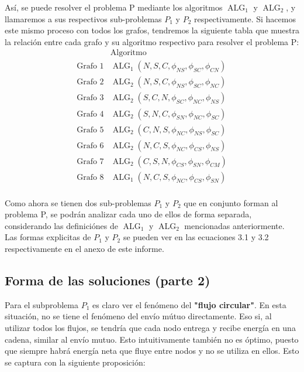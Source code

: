 \documentclass[12pt,twoside]{article}
\begin{document}
	\hspace{1cm} As\'i, se puede resolver el problema P mediante los algoritmos \(\operatorname{ALG}_1\) y \(\operatorname{ALG}_2\), y llamaremos a sus respectivos sub-problemas \(P_1\) y \(P_2\) respectivamente. Si hacemos este mismo proceso con todos los grafos, tendremos la siguiente tabla que muestra la relaci\'on entre cada grafo y su algoritmo respectivo para resolver el problema P:
	\begin{equation*}
		\begin{array}{c|c}
			& \text{Algoritmo} \\ \hline 
			\text{Grafo 1} & \operatorname{ALG}_1(N,S,C,\phi_{NS},\phi_{SC},\phi_{CN}) \\
			\text{Grafo 2} & \operatorname{ALG}_2(N,S,C,\phi_{NS},\phi_{SC},\phi_{NC}) \\
			\text{Grafo 3} & \operatorname{ALG}_2(S,C,N,\phi_{SC},\phi_{NC},\phi_{NS}) \\
			\text{Grafo 4} & \operatorname{ALG}_2(S,N,C,\phi_{SN},\phi_{NC},\phi_{SC}) \\
			\text{Grafo 5} &  \operatorname{ALG}_2(C,N,S,\phi_{NC},\phi_{NS},\phi_{SC})  \\
			\text{Grafo 6} & \operatorname{ALG}_2(N,C,S,\phi_{NC},\phi_{CS},\phi_{NS}) \\
			\text{Grafo 7} & \operatorname{ALG}_2(C,S,N,\phi_{CS},\phi_{SN},\phi_{CM}) \\
			\text{Grafo 8} & \operatorname{ALG}_1(N,C,S,\phi_{NC},\phi_{CS},\phi_{SN}) \\
		\end{array}
	\end{equation*}
	
	\hspace{1cm}Como ahora se tienen dos sub-problemas \(P_1\) y \(P_2\) que en conjunto forman al problema P, se podr\'an analizar cada uno de ellos de forma separada, considerando las definici\'ones de \(\operatorname{ALG}_1\) y \(\operatorname{ALG}_2\) mencionadas anteriormente. Las formas explicitas de \(P_1\) y \(P_2\) se pueden ver en las ecuaciones 3.1 y 3.2 respectivamente en el anexo de este informe.
	
	\subsection{Forma de las soluciones (parte 2)}
	\hspace{1cm} Para el subproblema \(P_1\) es claro ver el fen\'omeno del \textbf{"flujo circular"}. En esta situaci\'on, no se tiene el fen\'omeno del env\'io m\'utuo directamente. Eso si, al utilizar todos los flujos, se tendr\'ia que cada nodo entrega y recibe energ\'ia en una cadena, similar al env\'io mutuo. Esto intuitivamente tambi\'en no es \'optimo, puesto que siempre habr\'a energ\'ia neta que fluye entre nodos y no se utiliza en ellos. Esto se captura con la siguiente proposici\'on:
	\vspace{0.4cm}
	
\end{document}
